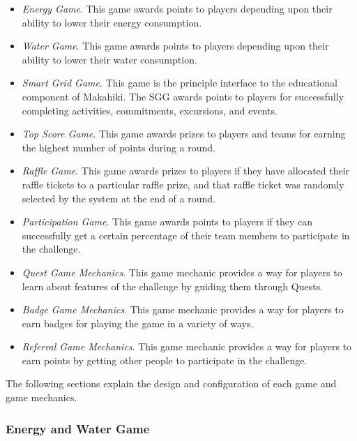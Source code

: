 \begin{itemize}

\item {\em Energy Game}. This game awards points to players depending upon their ability to lower their energy consumption.

\item {\em Water Game}. This game awards points to players depending upon their ability to lower their water consumption.

\item {\em Smart Grid Game}. This game is the principle interface to the educational component of Makahiki. The SGG awards points to players for successfully completing activities, commitments, excursions, and events.

\item {\em Top Score Game}. This game awards prizes to players and teams for earning the highest number of points during a round.

\item {\em Raffle Game}. This game awards prizes to players if they have allocated their raffle tickets to a particular raffle prize, and that raffle ticket was randomly selected by the system at the end of a round.

\item {\em Participation Game}. This game awards points to players if they can successfully get a certain percentage of their team members to participate in the challenge.

\item {\em Quest Game Mechanics}. This game mechanic provides a way for players to learn about features of the challenge by guiding them through Quests.

\item {\em Badge Game Mechanics}. This game mechanic provides a way for players to earn badges for playing the game in a variety of ways.

\item {\em Referral Game Mechanics}. This game mechanic provides a way for players to earn points by getting other people to participate in the challenge.

\end{itemize}

The following sections explain the design and configuration of each game and game mechanics.

\subsubsection{Energy and Water Game}


